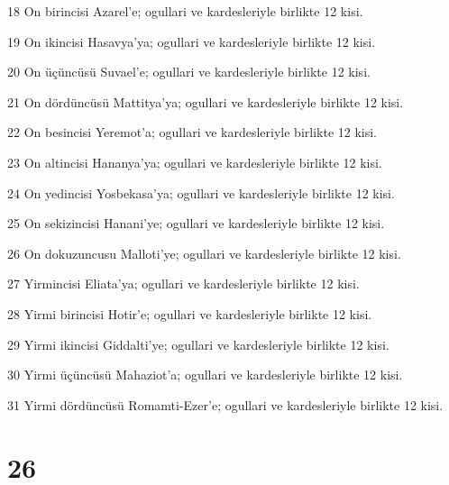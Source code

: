 \par 18 On birincisi Azarel'e; ogullari ve kardesleriyle birlikte 12 kisi.
\par 19 On ikincisi Hasavya'ya; ogullari ve kardesleriyle birlikte 12 kisi.
\par 20 On üçüncüsü Suvael'e; ogullari ve kardesleriyle birlikte 12 kisi.
\par 21 On dördüncüsü Mattitya'ya; ogullari ve kardesleriyle birlikte 12 kisi.
\par 22 On besincisi Yeremot'a; ogullari ve kardesleriyle birlikte 12 kisi.
\par 23 On altincisi Hananya'ya; ogullari ve kardesleriyle birlikte 12 kisi.
\par 24 On yedincisi Yosbekasa'ya; ogullari ve kardesleriyle birlikte 12 kisi.
\par 25 On sekizincisi Hanani'ye; ogullari ve kardesleriyle birlikte 12 kisi.
\par 26 On dokuzuncusu Malloti'ye; ogullari ve kardesleriyle birlikte 12 kisi.
\par 27 Yirmincisi Eliata'ya; ogullari ve kardesleriyle birlikte 12 kisi.
\par 28 Yirmi birincisi Hotir'e; ogullari ve kardesleriyle birlikte 12 kisi.
\par 29 Yirmi ikincisi Giddalti'ye; ogullari ve kardesleriyle birlikte 12 kisi.
\par 30 Yirmi üçüncüsü Mahaziot'a; ogullari ve kardesleriyle birlikte 12 kisi.
\par 31 Yirmi dördüncüsü Romamti-Ezer'e; ogullari ve kardesleriyle birlikte 12 kisi.

\chapter{26}

